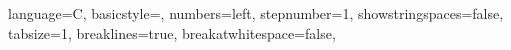\usepackage[utf8]{inputenc}

\usepackage[english]{babel}

\usepackage{cite}
\usepackage{hyperref}

\usepackage{amsmath,amssymb,amsfonts,amsthm,cancel}

\usepackage{algorithmic}

\usepackage{graphicx}

\usepackage{textcomp}

\usepackage[table]{xcolor}

\usepackage{float}

\usepackage{enumitem}

\usepackage{lettrine}

\usepackage{array}

\usepackage{caption}

\usepackage{comment}

\usepackage{multicol}

\usepackage{multirow}

\usepackage{tocbibind}

\usepackage{lipsum}

\usepackage{titlesec}

\usepackage{longtable}


\usepackage{listings}
\lstset
{
    language=C,
    basicstyle=\footnotesize,
    numbers=left,
    stepnumber=1,
    showstringspaces=false,
    tabsize=1,
    breaklines=true,
    breakatwhitespace=false,
}